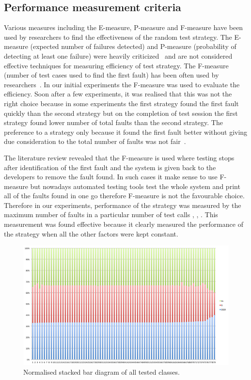 \documentclass{acm_proc_article-sp}
\begin{document}
\subsection{Performance measurement criteria}
Various measures including the E-measure, P-measure and F-measure have been used by researchers to find the effectiveness of the random test strategy. The E-measure (expected number of failures detected) and P-measure (probability of detecting at least one failure) were heavily criticized~\cite{Chen2008} and are not considered effective techniques for measuring efficiency of test strategy. The F-measure (number of test cases used to find the first fault) has been often used by researchers~\cite{Chen1996,Chen2004}. In our initial experiments the F-measure was used to evaluate the efficiency. Soon after a few experiments, it was realised that this was not the right choice because in some experiments the first strategy found the first fault quickly than the second strategy but on the completion of test session the first strategy found lower number of total faults than the second strategy. The preference to a strategy only because it found the first fault better without giving due consideration to the total number of faults was not fair~\cite{Liu2012}.


  
The literature review revealed that the F-measure is used where testing stops after identification of the first fault and the system is given back to the developers to remove the fault found. In such cases it make sense to use F-measure but nowadays automated testing tools test the whole system and print all of the faults found in one go therefore F-measure is not the favourable choice. Therefore in our experiments, performance of the strategy was measured by the maximum number of faults in a particular number of test calls \cite{Pacheco2007a}, \cite{Ciupa2007}, \cite{Ciupa2008b}. This measurement was found effective because it clearly measured the performance of the strategy when all the other factors were kept constant.

\begin{figure}[ht]
\centering
\includegraphics[width=18cm]{StackedBar100PercentMean.png}
\caption{Normalised stacked bar diagram of all tested classes.}
\label{fig:stackedbar}
\end{figure}
\end{document}

